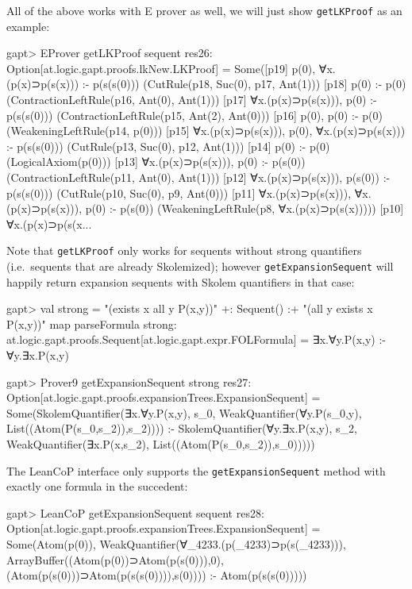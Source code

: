 \documentclass[a4paper,11pt]{article}
\newcommand{\cli}[1]{{\tt {#1}}}
\begin{document}
All of the above works with E prover as well, we will just show
\cli{getLKProof} as an example:
\begin{clilisting}
gapt> EProver getLKProof sequent
res26: Option[at.logic.gapt.proofs.lkNew.LKProof] =
Some([p19] p(0), ∀x.(p(x)⊃p(s(x))) :- p(s(s(0)))    (CutRule(p18, Suc(0), p17, Ant(1)))
[p18] p(0) :- p(0)    (ContractionLeftRule(p16, Ant(0), Ant(1)))
[p17] ∀x.(p(x)⊃p(s(x))), p(0) :- p(s(s(0)))    (ContractionLeftRule(p15, Ant(2), Ant(0)))
[p16] p(0), p(0) :- p(0)    (WeakeningLeftRule(p14, p(0)))
[p15] ∀x.(p(x)⊃p(s(x))), p(0), ∀x.(p(x)⊃p(s(x))) :- p(s(s(0)))    (CutRule(p13, Suc(0), p12, Ant(1)))
[p14] p(0) :- p(0)    (LogicalAxiom(p(0)))
[p13] ∀x.(p(x)⊃p(s(x))), p(0) :- p(s(0))    (ContractionLeftRule(p11, Ant(0), Ant(1)))
[p12] ∀x.(p(x)⊃p(s(x))), p(s(0)) :- p(s(s(0)))    (CutRule(p10, Suc(0), p9, Ant(0)))
[p11] ∀x.(p(x)⊃p(s(x))), ∀x.(p(x)⊃p(s(x))), p(0) :- p(s(0))    (WeakeningLeftRule(p8, ∀x.(p(x)⊃p(s(x)))))
[p10] ∀x.(p(x)⊃p(s(x...
\end{clilisting}

Note that \cli{getLKProof} only works for sequents without strong quantifiers
(i.e.\ sequents that are already Skolemized); however \cli{getExpansionSequent}
will happily return expansion sequents with Skolem quantifiers in that case:
\begin{clilisting}
gapt> val strong = "(exists x all y P(x,y))" +: Sequent() :+ "(all y exists x P(x,y))" map parseFormula
strong: at.logic.gapt.proofs.Sequent[at.logic.gapt.expr.FOLFormula] = ∃x.∀y.P(x,y) :- ∀y.∃x.P(x,y)

gapt> Prover9 getExpansionSequent strong
res27: Option[at.logic.gapt.proofs.expansionTrees.ExpansionSequent] = Some(SkolemQuantifier(∃x.∀y.P(x,y), s_{0}, WeakQuantifier(∀y.P(s_{0},y), List((Atom(P(s_{0},s_{2})),s_{2})))) :- SkolemQuantifier(∀y.∃x.P(x,y), s_{2}, WeakQuantifier(∃x.P(x,s_{2}), List((Atom(P(s_{0},s_{2})),s_{0})))))

\end{clilisting}

The LeanCoP interface only supports the \cli{getExpansionSequent} method with
exactly one formula in the succedent:
\begin{clilisting}
gapt> LeanCoP getExpansionSequent sequent
res28: Option[at.logic.gapt.proofs.expansionTrees.ExpansionSequent] = Some(Atom(p(0)), WeakQuantifier(∀_4233.(p(_4233)⊃p(s(_4233))), ArrayBuffer((Atom(p(0))⊃Atom(p(s(0))),0), (Atom(p(s(0)))⊃Atom(p(s(s(0)))),s(0)))) :- Atom(p(s(s(0)))))

\end{clilisting}
\end{document}
